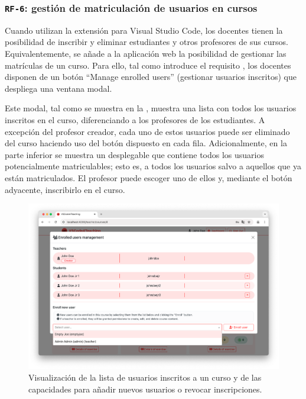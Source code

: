 \subsubsection{\texttt{RF-6}: gestión de matriculación de usuarios en cursos}
\label{subsec:rf6}

Cuando utilizan la extensión para Visual Studio Code, los docentes tienen la posibilidad de inscribir y eliminar estudiantes y otros profesores de sus cursos. Equivalentemente, se añade a la aplicación web la posibilidad de gestionar las matrículas de un curso. Para ello, tal como introduce el requisito , los docentes disponen de un botón ``Manage enrolled users'' (gestionar usuarios inscritos) que despliega una ventana modal.

Este modal, tal como se muestra en la , muestra una lista con todos los usuarios inscritos en el curso, diferenciando a los profesores de los estudiantes. A excepción del profesor creador, cada uno de estos usuarios puede ser eliminado del curso haciendo uso del botón dispuesto en cada fila. Adicionalmente, en la parte inferior se muestra un desplegable que contiene todos los usuarios potencialmente matriculables; esto es, a todos los usuarios salvo a aquellos que ya están matriculados. El profesor puede escoger uno de ellos y, mediante el botón adyacente, inscribirlo en el curso.

\begin{figure}[ht]
    \centering
    \includegraphics[width=\textwidth]{imagenes/utilizadas/4-3-implementacion/rf6-1.png}
    \caption{Visualización de la lista de usuarios inscritos a un curso y de las capacidades para añadir nuevos usuarios o revocar inscripciones.}
    \label{fig:reqf6-1}
\end{figure}
